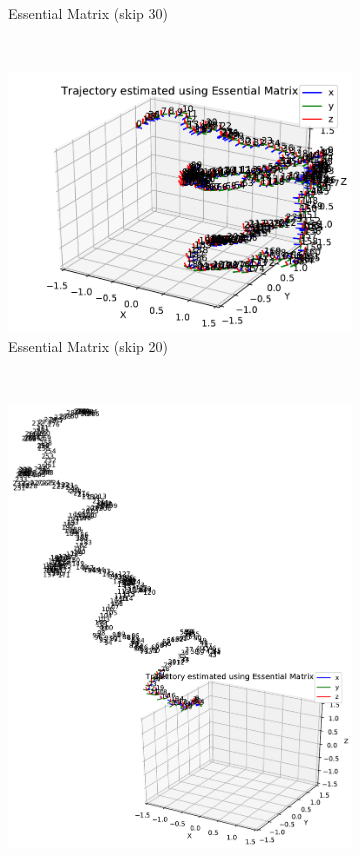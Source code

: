 \documentclass[12pt,a4paper]{article}
\begin{document}
\begin{figure}[p]
\begin{subfigure}[t]{0.3\textwidth}
        \caption{Essential Matrix (skip 30)}
      \end{subfigure} %
      ~
      \begin{subfigure}[t]{0.3\textwidth}
        \includegraphics[width=\textwidth]{../quad/basic-reg-saves-new-rectangle-2/20/atrj_rgb.pdf}
        \caption{Essential Matrix (skip 20)}
        \label{f: rect em}
      \end{subfigure} %
      ~
      \begin{subfigure}[t]{0.3\textwidth}
        \includegraphics[width=\textwidth]{../quad/basic-reg-saves-new-lawnmower/20/atrj_rgb.pdf}

\end{subfigure}
\end{figure}
\end{document}
